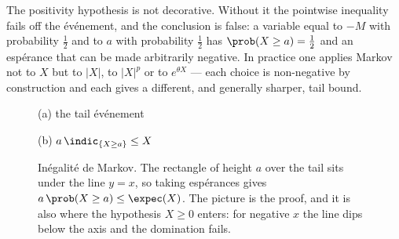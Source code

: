 The positivity hypothesis is not decorative. Without it the pointwise inequality
fails off the événement, and the conclusion is false: a variable equal to $-M$
with probability $\tfrac12$ and to $a$ with probability $\tfrac12$ has
$\prob(X \geq a) = \tfrac12$ and an espérance that can be made arbitrarily
negative. In practice one applies Markov not to $X$ but to $|X|$, to $|X|^{p}$ or
to $e^{\theta X}$ --- each choice is non-negative by construction and each gives a
different, and generally sharper, tail bound.

\begin{figure}[htbp]
  \centering
  \begin{minipage}[b]{0.46\textwidth}
    \centering

    {\small (a) the tail événement}
  \end{minipage}
  \hfill
  \begin{minipage}[b]{0.50\textwidth}
    \centering

    {\small (b) $a\,\indic_{\{X \geq a\}} \leq X$}
  \end{minipage}
  \caption{Inégalité de Markov. The rectangle of height $a$ over the tail sits
  under the line $y=x$, so taking espérances gives
  $a\,\prob(X \geq a) \leq \expec(X)$. The picture is the proof, and it is also
  where the hypothesis $X \geq 0$ enters: for negative $x$ the line dips below
  the axis and the domination fails.}
\end{figure}

